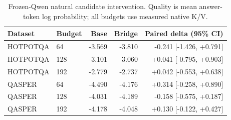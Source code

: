 \begin{table}[H]\centering\small
\begin{tabular}{llrrr}\toprule
Dataset & Budget & Base & Bridge & Paired delta (95\% CI) \\
\midrule
HOTPOTQA & 64 & -3.569 & -3.810 & -0.241 [-1.426, +0.791] \\
HOTPOTQA & 128 & -3.101 & -3.060 & +0.041 [-0.795, +0.903] \\
HOTPOTQA & 192 & -2.779 & -2.737 & +0.042 [-0.553, +0.638] \\
QASPER & 64 & -4.490 & -4.176 & +0.314 [-0.258, +0.890] \\
QASPER & 128 & -4.031 & -4.189 & -0.158 [-0.575, +0.187] \\
QASPER & 192 & -4.178 & -4.048 & +0.130 [-0.122, +0.427] \\
\bottomrule\end{tabular}
\caption{Frozen-Qwen natural candidate intervention. Quality is mean answer-token log probability; all budgets use measured native K/V.}
\label{tab:paper1-natural}
\end{table}
